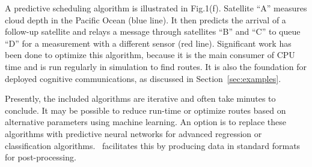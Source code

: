 \documentclass[conference]{IEEEtran}
\newcommand{\project}{{\sc{Collaborate}}~}
\begin{document}
A predictive scheduling algorithm is illustrated in Fig.1(f).  Satellite ``A''
measures cloud depth in the Pacific Ocean (blue line).  It then predicts the
arrival of a follow-up satellite and relays a message through satellites ``B''
and ``C'' to queue ``D'' for a measurement with a different sensor (red line).
Significant work has been done to optimize this algorithm, because it is the
main consumer of CPU time and is run regularly in simulation to find routes.  It
is also the foundation for deployed cognitive communications, as discussed in
Section~\ref{sec:examples}.

Presently, the included algorithms are iterative and often take minutes to
conclude.  It may be possible to reduce run-time or optimize routes based on
alternative parameters using machine learning.  An option is to replace these
algorithms with predictive neural networks for advanced regression or
classification algorithms.  \project facilitates this by producing data
in standard formats for post-processing.
\end{document}
